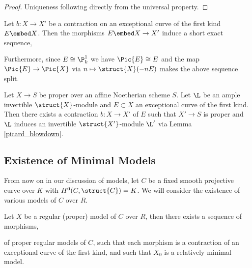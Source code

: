 \begin{proof}
Uniqueness following directly from the universal property.
\end{proof}


\begin{prop} \label{picard_blowdown}
Let $b : X \to X'$ be a contraction on an exceptional curve of the first kind $E \embed X$. Then the morphisms $E \embed X \to X'$ induce a short exact sequence,
\begin{center}
\end{center}
Furthermore, since $E \cong \P^1_k$ we have $\Pic{E} \cong E$ and the map $\Pic{E} \to \Pic{X}$ via $n \mapsto \struct{X}(-n E)$ makes the above sequence split. 
\end{prop}

\begin{prop} \label{existence_of_blowdown}
Let $X \to S$ be proper over an affine Noetherian scheme $S$. Let $\L$ be an ample invertible $\struct{X}$-module and $E \subset X$ an exceptional curve of the first kind. Then there exists a contraction $b : X \to X'$ of $E$ such that $X' \to S$ is proper and $\L$ induces an invertible $\struct{X'}$-module $\L'$ via Lemma \ref{picard_blowdown}. 
\end{prop}


\subsection{Existence of Minimal Models}

From now on in our discussion of models, let $C$ be a fixed smooth projective curve over $K$ with $H^0(C, \struct{C}) = K$. We will consider the existence of various models of $C$ over $R$. 

\begin{lemma} \label{blow_down_chains}
Let $X$ be a regular (proper) model of $C$ over $R$, then there exists a sequence of morphisms,
\begin{center}
\end{center}
of proper regular models of $C$, such that each morphism is a contraction of an exceptional curve of the first kind, and such that $X_0$ is a relatively minimal model.
\end{lemma}

